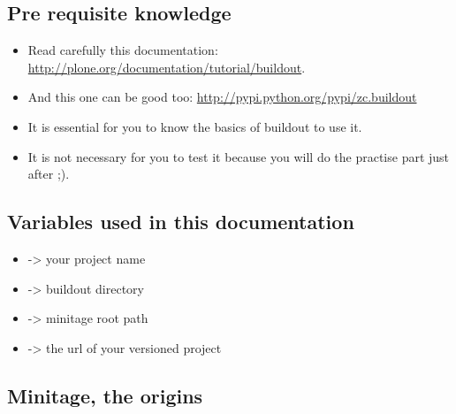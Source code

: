 \documentclass[letterpaper,10pt,english]{sphinxmanual}
\begin{document}
\subsection{Pre requisite knowledge}
\label{about:pre-requisite-knowledge}\begin{itemize}
\item {} 
Read carefully this documentation: \href{http://plone.org/documentation/tutorial/buildout}{http://plone.org/documentation/tutorial/buildout}.

\item {} 
And this one can be good too: \href{http://pypi.python.org/pypi/zc.buildout}{http://pypi.python.org/pypi/zc.buildout}

\item {} 
It is essential for you to know the basics of buildout to use it.

\item {} 
It is not necessary for you to test it because you will do the practise part just after ;).

\end{itemize}


\subsection{Variables used in this documentation}
\label{about:variables-used-in-this-documentation}\begin{itemize}
\item {} 
 -\textgreater{} your project name

\item {} 
 -\textgreater{} buildout directory

\item {} 
 -\textgreater{} minitage root path

\item {} 
 -\textgreater{} the url of your versioned project

\end{itemize}


\subsection{Minitage, the origins}
\label{about:minitage-the-origins}
\end{document}
